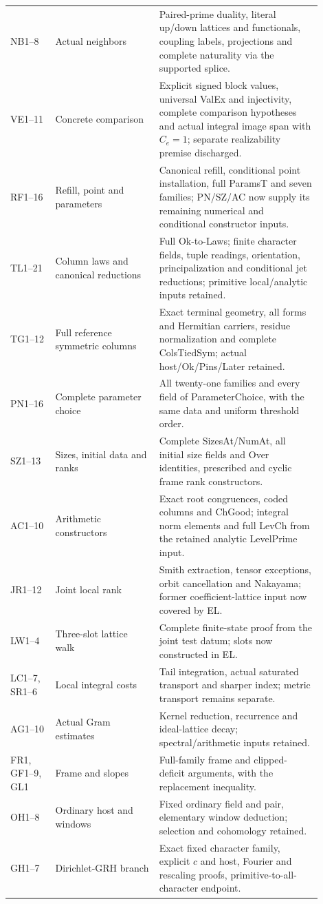 \documentclass[11pt,a4paper]{article}
\numberwithin{equation}{section}
\theoremstyle{remark}\newtheorem{remark}[theorem]{Remark}
\begin{document}
\begin{longtable}{>{\raggedright\arraybackslash}p{0.13\linewidth}>{\raggedright\arraybackslash}p{0.30\linewidth}>{\raggedright\arraybackslash}p{0.47\linewidth}}
NB1--8 & Actual neighbors & Paired-prime duality, literal up/down lattices and functionals, coupling labels, projections and complete naturality via the supported splice.\\[3pt]
VE1--11 & Concrete comparison & Explicit signed block values, universal ValEx and injectivity, complete comparison hypotheses and actual integral image span with $C_e=1$; separate realizability premise discharged.\\[3pt]
RF1--16 & Refill, point and parameters & Canonical refill, conditional point installation, full ParamsT and seven families; PN/SZ/AC now supply its remaining numerical and conditional constructor inputs.\\[3pt]
TL1--21 & Column laws and canonical reductions & Full Ok-to-Laws; finite character fields, tuple readings, orientation, principalization and conditional jet reductions; primitive local/analytic inputs retained.\\[3pt]
TG1--12 & Full reference symmetric columns & Exact terminal geometry, all forms and Hermitian carriers, residue normalization and complete ColsTiedSym; actual host/Ok/Pins/Later retained.\\[3pt]
PN1--16 & Complete parameter choice & All twenty-one families and every field of ParameterChoice, with the same data and uniform threshold order.\\[3pt]
SZ1--13 & Sizes, initial data and ranks & Complete SizesAt/NumAt, all initial size fields and Over identities, prescribed and cyclic frame rank constructors.\\[3pt]
AC1--10 & Arithmetic constructors & Exact root congruences, coded columns and ChGood; integral norm elements and full LevCh from the retained analytic LevelPrime input.\\[3pt]
JR1--12 & Joint local rank & Smith extraction, tensor exceptions, orbit cancellation and Nakayama; former coefficient-lattice input now covered by EL.\\[3pt]
LW1--4 & Three-slot lattice walk & Complete finite-state proof from the joint test datum; slots now constructed in EL.\\[3pt]
LC1--7, SR1--6 & Local integral costs & Tail integration, actual saturated transport and sharper index; metric transport remains separate.\\[3pt]
AG1--10 & Actual Gram estimates & Kernel reduction, recurrence and ideal-lattice decay; spectral/arithmetic inputs retained.\\[3pt]
FR1, GF1--9, GL1 & Frame and slopes & Full-family frame and clipped-deficit arguments, with the replacement inequality.\\[3pt]
OH1--8 & Ordinary host and windows & Fixed ordinary field and pair, elementary window deduction; selection and cohomology retained.\\[3pt]
GH1--7 & Dirichlet-GRH branch & Exact fixed character family, explicit $c$ and host, Fourier and rescaling proofs, primitive-to-all-character endpoint.\\
\bottomrule
\end{longtable}
\end{document}
